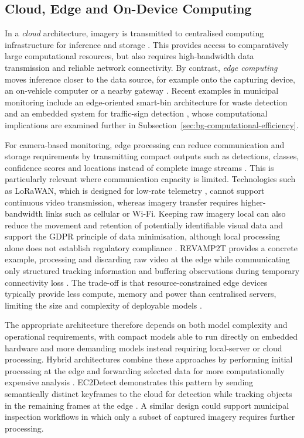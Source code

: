 \subsection{Cloud, Edge and On-Device Computing}
\label{sec:bg-edge}
In a \emph{cloud} architecture, imagery is transmitted to centralised computing infrastructure for inference and storage \cite{armbrust2010cloud,mell2011nist}. This provides access to comparatively large computational resources, but also requires high-bandwidth data transmission and reliable network connectivity. By contrast, \emph{edge computing} moves inference closer to the data source, for example onto the capturing device, an on-vehicle computer or a nearby gateway \cite{shi2016edge,satyanarayanan2017edge,zhou2019edgeintelligence}. Recent examples in municipal monitoring include an edge-oriented smart-bin architecture for waste detection and an embedded system for traffic-sign detection \cite{rai2026ewyolo,sarvajcz2024aiontheroad}, whose computational implications are examined further in Subsection~\ref{sec:bg-computational-efficiency}.

For camera-based monitoring, edge processing can reduce communication and storage requirements by transmitting compact outputs such as detections, classes, confidence scores and locations instead of complete image streams \cite{hu2023edgevideoanalytics}. This is particularly relevant where communication capacity is limited. Technologies such as \gls{LoRaWAN}, which is designed for low-rate telemetry \cite{lora-edge-paper}, cannot support continuous video transmission, whereas imagery transfer requires higher-bandwidth links such as cellular or Wi-Fi. Keeping raw imagery local can also reduce the movement and retention of potentially identifiable visual data and support the \gls{GDPR} principle of data minimisation, although local processing alone does not establish regulatory compliance \cite{gdpr}. REVAMP2T provides a concrete example, processing and discarding raw video at the edge while communicating only structured tracking information and buffering observations during temporary connectivity loss \cite{neff2020revamp2t}. The trade-off is that resource-constrained edge devices typically provide less compute, memory and power than centralised servers, limiting the size and complexity of deployable models \cite{zhou2019edgeintelligence}.

\newpage
\noindent The appropriate architecture therefore depends on both model complexity and operational requirements, with compact models able to run directly on embedded hardware and more demanding models instead requiring local-server or cloud processing. Hybrid architectures combine these approaches by performing initial processing at the edge and forwarding selected data for more computationally expensive analysis \cite{hu2023edgevideoanalytics}. EC2Detect demonstrates this pattern by sending semantically distinct keyframes to the cloud for detection while tracking objects in the remaining frames at the edge \cite{guo2022ec2detect}. A similar design could support municipal inspection workflows in which only a subset of captured imagery requires further processing.

